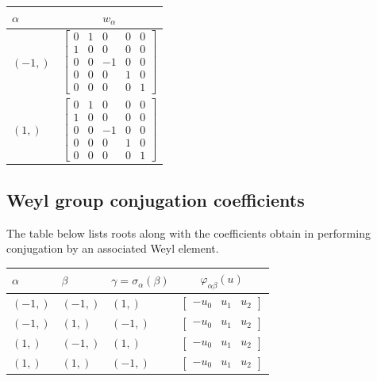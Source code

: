 \documentclass[11pt]{article}
\newcommand{\noi}{\noindent}
\theoremstyle{definition}
\begin{document}
\noi \noindent \begin{longtable}{|l|c|}
    \hline
    $\alpha$ & $w_\alpha$ \\
    \hline
    \endhead
    $\left( -1,\right)$ & ${\left[\begin{matrix}0 & 1 & 0 & 0 & 0\\1 & 0 & 0 & 0 & 0\\0 & 0 & -1 & 0 & 0\\0 & 0 & 0 & 1 & 0\\0 & 0 & 0 & 0 & 1\end{matrix}\right]}$ \\
    \hline
    $\left( 1,\right)$ & ${\left[\begin{matrix}0 & 1 & 0 & 0 & 0\\1 & 0 & 0 & 0 & 0\\0 & 0 & -1 & 0 & 0\\0 & 0 & 0 & 1 & 0\\0 & 0 & 0 & 0 & 1\end{matrix}\right]}$ \\
    \hline
\end{longtable}


\subsection{Weyl group conjugation coefficients}

The table below lists roots along with the coefficients obtain in performing conjugation by an associated Weyl element.

\bigskip

\noi \noindent \begin{longtable}{|l|l|l|c|}
    \hline
    \textbf{$\alpha$} & \textbf{$\beta$} & \textbf{$\gamma = \sigma_{\alpha}(\beta)$} & $\varphi_{\alpha\beta}(u)$ \\
    \hline
    \endhead
    $\left( -1,\right)$ & $\left( -1,\right)$ & $\left( 1,\right)$ & $\left[\begin{matrix}- u_{0} & u_{1} & u_{2}\end{matrix}\right]$ \\
    \hline
    $\left( -1,\right)$ & $\left( 1,\right)$ & $\left( -1,\right)$ & $\left[\begin{matrix}- u_{0} & u_{1} & u_{2}\end{matrix}\right]$ \\
    \hline
    $\left( 1,\right)$ & $\left( -1,\right)$ & $\left( 1,\right)$ & $\left[\begin{matrix}- u_{0} & u_{1} & u_{2}\end{matrix}\right]$ \\
    \hline
    $\left( 1,\right)$ & $\left( 1,\right)$ & $\left( -1,\right)$ & $\left[\begin{matrix}- u_{0} & u_{1} & u_{2}\end{matrix}\right]$ \\
    \hline
\end{longtable}
\end{document}
